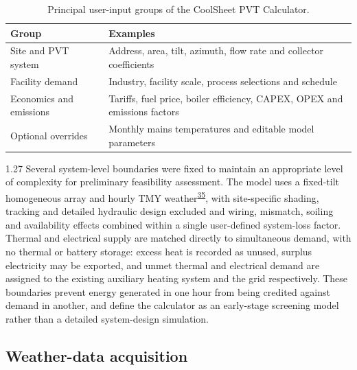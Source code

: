 \documentclass[12pt,letterpaper]{article}
\newcommand{\done}{\ \textcolor{green!45!black}{$\checkmark$}} %
\DeclareRobustCommand{\citenum}[1]{\hyperlink{ref:#1}{#1}} %
\begin{document}
\begin{table}[htbp]
\centering
\renewcommand{\thetable}{3}
\small
\begin{tabular}{@{}>{\raggedright\arraybackslash}p{1.7in}>{\raggedright\arraybackslash}p{4.1in}@{}}
\toprule
\textbf{Group} & \textbf{Examples} \\
\midrule
Site and PVT system & Address, area, tilt, azimuth, flow rate and collector coefficients \\
Facility demand & Industry, facility scale, process selections and schedule \\
Economics and emissions & Tariffs, fuel price, boiler efficiency, CAPEX, OPEX and emissions factors \\
Optional overrides & Monthly mains temperatures and editable model parameters \\
\bottomrule
\end{tabular}
\caption{Principal user-input groups of the CoolSheet PVT Calculator.}
\label{tab:input-groups}
\end{table}

\begin{spacing}{1.27}
Several system-level boundaries were fixed to maintain an appropriate level of complexity for preliminary feasibility assessment. The model uses a fixed-tilt homogeneous array and hourly TMY weather\textsuperscript{\citenum{35}}, with site-specific shading, tracking and detailed hydraulic design excluded and wiring, mismatch, soiling and availability effects combined within a single user-defined system-loss factor. Thermal and electrical supply are matched directly to simultaneous demand, with no thermal or battery storage: excess heat is recorded as unused, surplus electricity may be exported, and unmet thermal and electrical demand are assigned to the existing auxiliary heating system and the grid respectively. These boundaries prevent energy generated in one hour from being credited against demand in another, and define the calculator as an early-stage screening model rather than a detailed system-design simulation.\par
\end{spacing}

\subsection[Weather-data acquisition\done]{Weather-data acquisition}\label{sec20}
\end{document}
